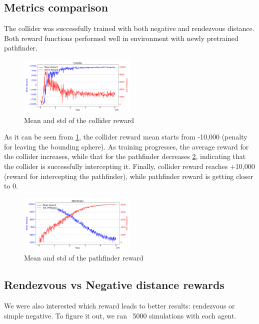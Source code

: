 
\subsection{Metrics comparison}\label{subsec:reward-comparison}
The collider was successfully trained with both negative and rendezvous distance.
Both reward functions performed well in environment with newly pretrained pathfinder.
\begin{figure}[H]
	\centering
	\includegraphics[width=0.5\textwidth]{images/collider_plot.png}
	\caption{Mean and std of the collider reward}
	\label{fig:collider_reward}
\end{figure}
As it can be seen from \ref{fig:collider_reward}, the collider reward mean starts from -10,000 (penalty for leaving the bounding sphere).
As training progresses, the average reward for the collider increases, while that for the pathfinder decreases \ref{fig:pathfinder_reward}, indicating that the collider is successfully intercepting it.
Finally, collider reward reaches +10,000 (reward for intercepting the pathfinder), while pathfinder reward is getting closer to 0.
\begin{figure}[H]
	\centering
	\includegraphics[width=0.5\textwidth]{images/pathfinder_plot.png}
	\caption{Mean and std of the pathfinder reward}
	\label{fig:pathfinder_reward}
\end{figure}

\subsection{Rendezvous vs Negative distance rewards}\label{subsec:rendezvous-vs-negative-distance-rewards}
We were also interested which reward leads to better results: rendezvous or simple negative.
To figure it out, we ran ~5000 simulations with each agent.

